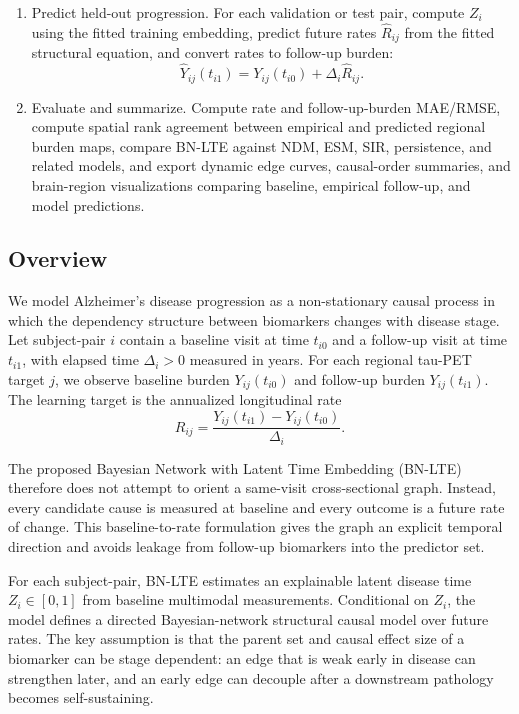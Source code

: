 \begin{enumerate}
\item Predict held-out progression. For each validation or test pair, compute
$Z_i$ using the fitted training embedding, predict future rates
$\widehat{R}_{ij}$ from the fitted structural equation, and convert rates to
follow-up burden:
\begin{equation}
\widehat{Y}_{ij}(t_{i1})
=
Y_{ij}(t_{i0}) + \Delta_i \widehat{R}_{ij}.
\end{equation}

\item Evaluate and summarize. Compute rate and follow-up-burden MAE/RMSE,
compute spatial rank agreement between empirical and predicted regional burden
maps, compare BN-LTE against NDM, ESM, SIR, persistence, and related models,
and export dynamic edge curves, causal-order summaries, and brain-region
visualizations comparing baseline, empirical follow-up, and model predictions.
\end{enumerate}

\subsection{Overview}

We model Alzheimer's disease progression as a non-stationary causal process in
which the dependency structure between biomarkers changes with disease stage.
Let subject-pair $i$ contain a baseline visit at time $t_{i0}$ and a follow-up
visit at time $t_{i1}$, with elapsed time $\Delta_i>0$ measured in years. For
each regional tau-PET target $j$, we observe baseline burden
$Y_{ij}(t_{i0})$ and follow-up burden $Y_{ij}(t_{i1})$. The learning target is
the annualized longitudinal rate
\begin{equation}
R_{ij}
=
\frac{Y_{ij}(t_{i1}) - Y_{ij}(t_{i0})}{\Delta_i}.
\label{eq:bnlte_rate}
\end{equation}

The proposed Bayesian Network with Latent Time Embedding (BN-LTE) therefore
does not attempt to orient a same-visit cross-sectional graph. Instead, every
candidate cause is measured at baseline and every outcome is a future rate of
change. This baseline-to-rate formulation gives the graph an explicit temporal
direction and avoids leakage from follow-up biomarkers into the predictor set.

For each subject-pair, BN-LTE estimates an explainable latent disease time
$Z_i \in [0,1]$ from baseline multimodal measurements. Conditional on $Z_i$,
the model defines a directed Bayesian-network structural causal model over
future rates. The key assumption is that the parent set and causal effect size
of a biomarker can be stage dependent: an edge that is weak early in disease can
strengthen later, and an early edge can decouple after a downstream pathology
becomes self-sustaining.

